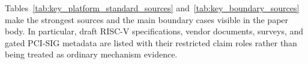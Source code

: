 \documentclass[conference]{IEEEtran}
\begin{document}
Tables~\ref{tab:key_platform_standard_sources} and~\ref{tab:key_boundary_sources}
make the strongest sources and the main boundary cases visible in the paper
body. In particular, draft RISC-V specifications, vendor documents, surveys,
and gated PCI-SIG metadata are listed with their restricted claim roles rather
than being treated as ordinary mechanism evidence.













\end{document}
